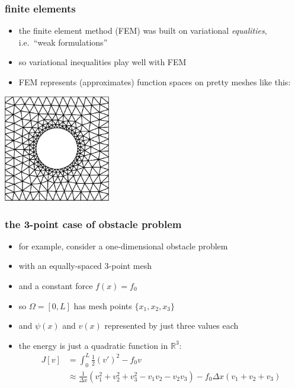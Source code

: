 \documentclass{beamer}
\newcommand{\RR}{\mathbb{R}}
\begin{document}
\begin{frame}
  \frametitle{finite elements}

\begin{itemize}
\item the finite element method (FEM) was built on variational \emph{equalities}, i.e.~``weak formulations''
\item so variational inequalities play well with FEM
\item FEM represents (approximates) function spaces on pretty meshes like this:
\end{itemize}

\begin{center}
\includegraphics[width=0.35\textwidth]{figs/constantineexample3}
\end{center}
\end{frame}


\begin{frame}
  \frametitle{the 3-point case of obstacle problem}

\begin{itemize}
\item for example, consider a one-dimensional obstacle problem
\item with an equally-spaced 3-point mesh
\item and a constant force $f(x) = f_0$
\item so $\Omega = [0,L]$ has mesh points $\{x_1,x_2,x_3\}$
\item and $\psi(x)$ and $v(x)$ represented by just three values each
\item the energy is just a quadratic function in $\RR^3$:
\begin{align*}
 J[v] &= \int_0^L \frac{1}{2} (v')^2 - f_0 v \\
      &\approx \frac{1}{\Delta x} \left(v_1^2 + v_2^2 + v_3^2 - v_1 v_2 - v_2 v_3\right) - f_0 \Delta x (v_1+v_2+v_3)
\end{align*}
\end{itemize}
\end{frame}
\end{document}
